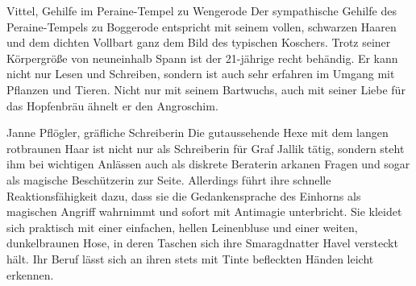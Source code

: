  




Vittel, Gehilfe im Peraine-Tempel zu Wengerode
Der sympathische Gehilfe des Peraine-Tempels zu Boggerode entspricht mit seinem vollen, schwarzen Haaren und dem dichten Vollbart ganz dem Bild des typischen Koschers. Trotz seiner Körpergröße von neuneinhalb Spann ist der 21-jährige recht behändig. Er kann nicht nur Lesen und Schreiben, sondern ist auch sehr erfahren im Umgang mit Pflanzen und Tieren. Nicht nur mit seinem Bartwuchs, auch mit seiner Liebe für das Hopfenbräu ähnelt er den Angroschim.



Janne Pflögler, gräfliche Schreiberin
Die gutaussehende Hexe mit dem langen rotbraunen Haar ist nicht nur als Schreiberin für Graf Jallik tätig, sondern steht ihm bei wichtigen Anlässen auch als diskrete Beraterin arkanen Fragen und sogar als magische Beschützerin zur Seite. Allerdings führt ihre schnelle Reaktionsfähigkeit dazu, dass sie die Gedankensprache des Einhorns als magischen Angriff wahrnimmt und sofort mit Antimagie unterbricht.
Sie kleidet sich praktisch mit einer einfachen, hellen Leinenbluse und einer weiten, dunkelbraunen Hose, in deren Taschen sich ihre Smaragdnatter Havel versteckt hält. Ihr Beruf lässt sich an ihren stets mit Tinte befleckten Händen leicht erkennen.

\spaltenende